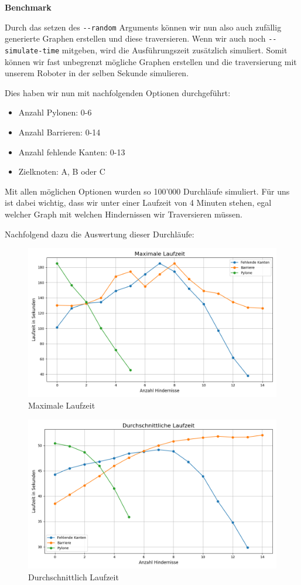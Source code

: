 \textbf{Benchmark}

Durch das setzen des \verb|--random| Arguments können wir nun also auch zufällig generierte Graphen erstellen und diese traversieren.
Wenn wir auch noch \verb|--simulate-time| mitgeben, wird die Ausführungszeit zusätzlich simuliert.
Somit können wir fast unbegrenzt mögliche Graphen erstellen und die traversierung mit unserem Roboter in der selben Sekunde simulieren.

Dies haben wir nun mit nachfolgenden Optionen durchgeführt:

\begin{itemize}
  \item Anzahl Pylonen: 0-6
  \item Anzahl Barrieren: 0-14
  \item Anzahl fehlende Kanten: 0-13
  \item Zielknoten: A, B oder C
\end{itemize}

Mit allen möglichen Optionen wurden so 100'000 Durchläufe simuliert.
Für uns ist dabei wichtig, dass wir unter einer Laufzeit von 4 Minuten stehen, egal welcher Graph mit welchen Hindernissen wir Traversieren müssen.

Nachfolgend dazu die Auswertung dieser Durchläufe:

\begin{figure}[H]
  \centering\includegraphics[width=0.75\linewidth]{assets/informatik-prototyp/simulator/max_seconds.png}
  \caption{Maximale Laufzeit}
  \label{fig:simulation-run-max-seconds}
\end{figure}

\begin{figure}[H]
  \centering\includegraphics[width=0.75\linewidth]{assets/informatik-prototyp/simulator/mean_seconds.png}
  \caption{Durchschnittlich Laufzeit}
  \label{fig:simulation-run-mean-seconds}
\end{figure}

